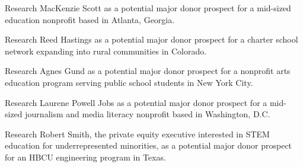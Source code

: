 \documentclass[11pt,a4paper]{article}
\begin{document}
\begin{description}[leftmargin=*,style=unboxed]
  \item[MacKenzie Scott.] Research MacKenzie Scott as a potential major donor prospect for a mid-sized education nonprofit based in Atlanta, Georgia.
  \item[Reed Hastings.] Research Reed Hastings as a potential major donor prospect for a charter school network expanding into rural communities in Colorado.
  \item[Agnes Gund.] Research Agnes Gund as a potential major donor prospect for a nonprofit arts education program serving public school students in New York City.
  \item[Laurene Powell Jobs.] Research Laurene Powell Jobs as a potential major donor prospect for a mid-sized journalism and media literacy nonprofit based in Washington, D.C.
  \item[Robert F.~Smith.] Research Robert Smith, the private equity executive interested in STEM education for underrepresented minorities, as a potential major donor prospect for an HBCU engineering program in Texas.
\end{description}
\end{document}
